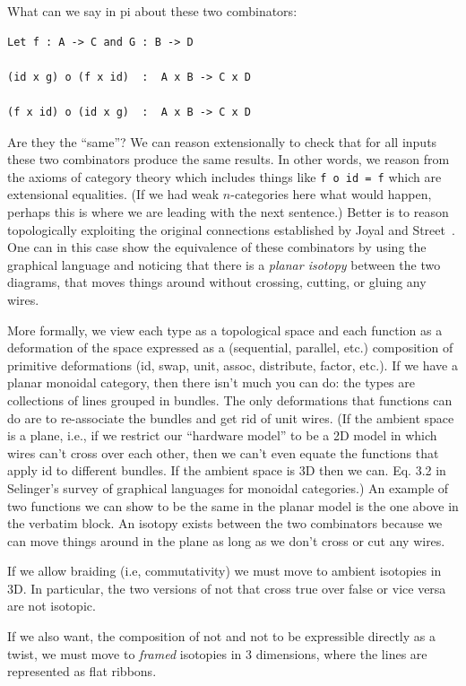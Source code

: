 \documentclass[11pt]{article}
\begin{document}
\newpage

What can we say in pi about these two combinators:
\begin{verbatim}
Let f : A -> C and G : B -> D

(id x g) o (f x id)  :  A x B -> C x D

(f x id) o (id x g)  :  A x B -> C x D
\end{verbatim}
Are they the ``same''? We can reason extensionally to check that for all
inputs these two combinators produce the same results. In other words, we
reason from the axioms of category theory which includes things like
\verb|f o id = f| which are extensional equalities. (If we had weak
$n$-categories here what would happen, perhaps this is where we are leading
with the next sentence.) Better is to reason topologically exploiting the
original connections established by Joyal and
Street~\cite{planardiagrams,geometrytensor}. One can in this case show the
equivalence of these combinators by using the graphical language and noticing
that there is a \emph{planar isotopy} between the two diagrams, that moves
things around without crossing, cutting, or gluing any wires. 

More formally, we view each type as a topological space and each function as
a deformation of the space expressed as a (sequential, parallel, etc.)
composition of primitive deformations (id, swap, unit, assoc, distribute,
factor, etc.). If we have a planar monoidal category, then there isn't much
you can do: the types are collections of lines grouped in bundles. The only
deformations that functions can do are to re-associate the bundles and get
rid of unit wires. (If the ambient space is a plane, i.e., if we restrict our
``hardware model'' to be a 2D model in which wires can't cross over each
other, then we can't even equate the functions that apply id to different
bundles. If the ambient space is 3D then we can. Eq. 3.2 in Selinger's survey
of graphical languages for monoidal categories.) An example of two functions
we can show to be the same in the planar model is the one above in the
verbatim block. An isotopy exists between the two combinators because we can
move things around in the plane as long as we don't cross or cut any wires.

If we allow braiding (i.e, commutativity) we must move to ambient isotopies
in 3D. In particular, the two versions of not that cross true over false or
vice versa are not isotopic.

If we also want, the composition of not and not to be expressible directly as
a twist, we must move to \emph{framed} isotopies in 3 dimensions, where the
lines are represented as flat ribbons.
\end{document}
